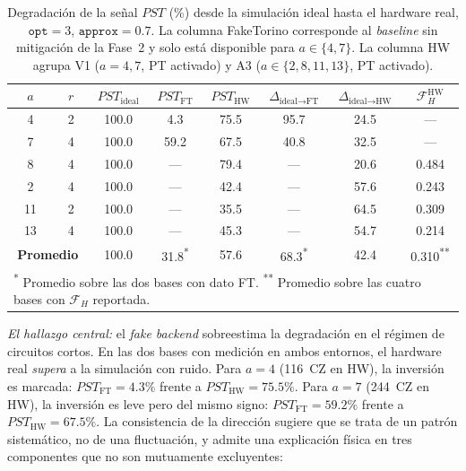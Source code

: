 \documentclass[12pt, spanish]{book}
\begin{document}
\begin{table}[H]
    \centering
    \caption{Degradación de la señal $PST$ (\%) desde la simulación ideal hasta el hardware real, $\texttt{opt} = 3$, $\texttt{approx} = 0.7$. La columna FakeTorino corresponde al \textit{baseline} sin mitigación de la Fase~2 y solo está disponible para $a \in \{4, 7\}$. La columna HW agrupa V1 ($a = 4, 7$, PT activado) y A3 ($a \in \{2, 8, 11, 13\}$, PT activado).\\}
    \label{tab:degradacion_cascada}
    \begin{tabular}{cccccccc}
        \hline
        $a$ & $r$ & $PST_{\text{ideal}}$ & $PST_{\text{FT}}$ & $PST_{\text{HW}}$ & $\Delta_{\text{ideal} \to \text{FT}}$ & $\Delta_{\text{ideal} \to \text{HW}}$ & $\mathcal{F}_H^{\text{HW}}$ \\
        \hline
        4   & 2 & 100.0 & 4.3   & 75.5 & 95.7 & 24.5 & ---   \\
        7   & 4 & 100.0 & 59.2  & 67.5 & 40.8 & 32.5 & ---   \\
        8   & 4 & 100.0 & ---   & 79.4 & ---  & 20.6 & 0.484 \\
        2   & 4 & 100.0 & ---   & 42.4 & ---  & 57.6 & 0.243 \\
        11  & 2 & 100.0 & ---   & 35.5 & ---  & 64.5 & 0.309 \\
        13  & 4 & 100.0 & ---   & 45.3 & ---  & 54.7 & 0.214 \\
        \hline
        \multicolumn{2}{c}{\textbf{Promedio}} & 100.0 & 31.8\textsuperscript{*} & 57.6 & 68.3\textsuperscript{*} & 42.4 & 0.310\textsuperscript{**} \\
        \hline
        \multicolumn{8}{l}{\footnotesize \textsuperscript{*} Promedio sobre las dos bases con dato FT. \textsuperscript{**} Promedio sobre las cuatro bases con $\mathcal{F}_H$ reportada.} \\
    \end{tabular}
\end{table}

\textit{El hallazgo central:} el \textit{fake backend} sobreestima la degradación en el régimen de circuitos cortos. En las dos bases con medición en ambos entornos, el hardware real \emph{supera} a la simulación con ruido. Para $a = 4$ (116~CZ en HW), la inversión es marcada: $PST_{\text{FT}} = 4.3\%$ frente a $PST_{\text{HW}} = 75.5\%$. Para $a = 7$ (244~CZ en HW), la inversión es leve pero del mismo signo: $PST_{\text{FT}} = 59.2\%$ frente a $PST_{\text{HW}} = 67.5\%$. La consistencia de la dirección sugiere que se trata de un patrón sistemático, no de una fluctuación, y admite una explicación física en tres componentes que no son mutuamente excluyentes:
\end{document}
